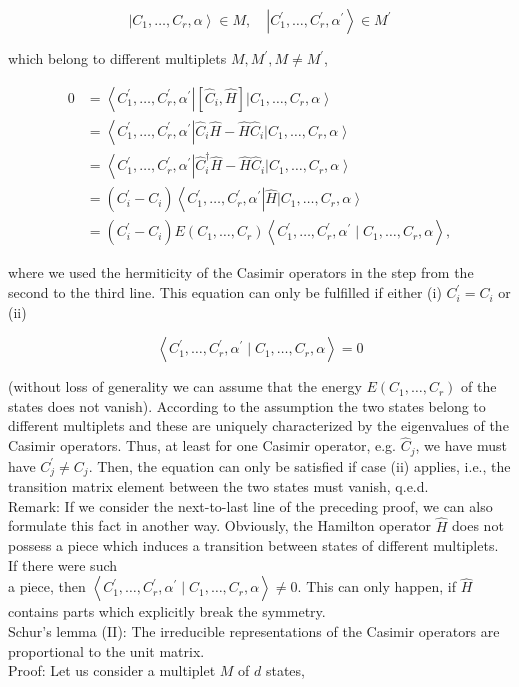 \documentclass[10pt, letterpaper]{article}
\begin{document}
$$
\left|C_{1}, \ldots, C_{r}, \alpha\right\rangle \in M, \quad\left|C_{1}^{\prime}, \ldots, C_{r}^{\prime}, \alpha^{\prime}\right\rangle \in M^{\prime}
$$

which belong to different multiplets $M, M^{\prime}, M \neq M^{\prime}$,

$$
\begin{aligned}
0 & =\left\langle C_{1}^{\prime}, \ldots, C_{r}^{\prime}, \alpha^{\prime}\right|\left[\hat{C}_{i}, \hat{H}\right]\left|C_{1}, \ldots, C_{r}, \alpha\right\rangle \\
& =\left\langle C_{1}^{\prime}, \ldots, C_{r}^{\prime}, \alpha^{\prime}\right| \hat{C}_{i} \hat{H}-\hat{H} \hat{C}_{i}\left|C_{1}, \ldots, C_{r}, \alpha\right\rangle \\
& =\left\langle C_{1}^{\prime}, \ldots, C_{r}^{\prime}, \alpha^{\prime}\right| \hat{C}_{i}^{\dagger} \hat{H}-\hat{H} \hat{C}_{i}\left|C_{1}, \ldots, C_{r}, \alpha\right\rangle \\
& =\left(C_{i}^{\prime}-C_{i}\right)\left\langle C_{1}^{\prime}, \ldots, C_{r}^{\prime}, \alpha^{\prime}\right| \hat{H}\left|C_{1}, \ldots, C_{r}, \alpha\right\rangle \\
& =\left(C_{i}^{\prime}-C_{i}\right) E\left(C_{1}, \ldots, C_{r}\right)\left\langle C_{1}^{\prime}, \ldots, C_{r}^{\prime}, \alpha^{\prime} \mid C_{1}, \ldots, C_{r}, \alpha\right\rangle,
\end{aligned}
$$

where we used the hermiticity of the Casimir operators in the step from the second to the third line. This equation can only be fulfilled if either (i) $C_{i}^{\prime}=C_{i}$ or (ii)

$$
\left\langle C_{1}^{\prime}, \ldots, C_{r}^{\prime}, \alpha^{\prime} \mid C_{1}, \ldots, C_{r}, \alpha\right\rangle=0
$$

(without loss of generality we can assume that the energy $E\left(C_{1}, \ldots, C_{r}\right)$ of the states does not vanish). According to the assumption the two states belong to different multiplets and these are uniquely characterized by the eigenvalues of the Casimir operators. Thus, at least for one Casimir operator, e.g. $\hat{C}_{j}$, we have must have $C_{j}^{\prime} \neq C_{j}$. Then, the equation can only be satisfied if case (ii) applies, i.e., the transition matrix element between the two states must vanish, q.e.d.\\
Remark: If we consider the next-to-last line of the preceding proof, we can also formulate this fact in another way. Obviously, the Hamilton operator $\hat{H}$ does not possess a piece which induces a transition between states of different multiplets. If there were such\\
a piece, then $\left\langle C_{1}^{\prime}, \ldots, C_{r}^{\prime}, \alpha^{\prime} \mid C_{1}, \ldots, C_{r}, \alpha\right\rangle \neq 0$. This can only happen, if $\hat{H}$ contains parts which explicitly break the symmetry.\\
Schur's lemma (II): The irreducible representations of the Casimir operators are proportional to the unit matrix.\\
Proof: Let us consider a multiplet $M$ of $d$ states,
\end{document}

